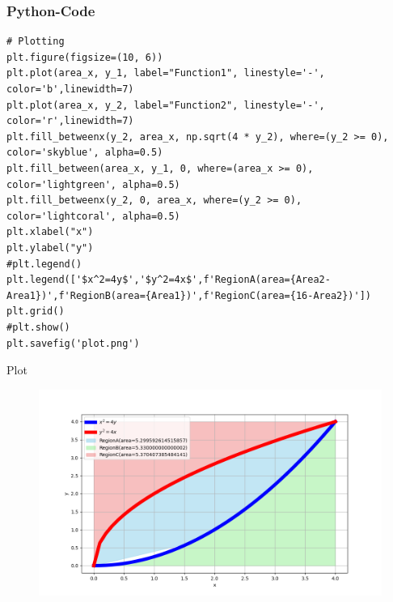 \documentclass{beamer}
\begin{document}
\begin{frame}[fragile]
\frametitle{Python-Code}
\begin{verbatim}
# Plotting
plt.figure(figsize=(10, 6))
plt.plot(area_x, y_1, label="Function1", linestyle='-', color='b',linewidth=7)
plt.plot(area_x, y_2, label="Function2", linestyle='-', color='r',linewidth=7)
plt.fill_betweenx(y_2, area_x, np.sqrt(4 * y_2), where=(y_2 >= 0), color='skyblue', alpha=0.5)
plt.fill_between(area_x, y_1, 0, where=(area_x >= 0), color='lightgreen', alpha=0.5)
plt.fill_betweenx(y_2, 0, area_x, where=(y_2 >= 0), color='lightcoral', alpha=0.5)
plt.xlabel("x")
plt.ylabel("y")
#plt.legend()
plt.legend(['$x^2=4y$','$y^2=4x$',f'RegionA(area={Area2-Area1})',f'RegionB(area={Area1})',f'RegionC(area={16-Area2})'])
plt.grid()
#plt.show()
plt.savefig('plot.png')
\end{verbatim}
\end{frame}
\begin{frame}{Plot}
\begin{figure}[h!]
   \centering
   \includegraphics[width=1\columnwidth]{figs/Q3.png}
\end{figure}
    
\end{frame}
\end{document}
